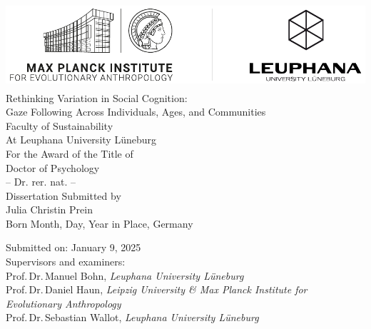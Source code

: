 \documentclass[
]{scrbook}
\author{}
\date{\vspace{-2.5em}}
\begin{document}
\frontmatter

\begin{titlepage}                   
    \begin{center}
        \includegraphics[height=3.2cm]{logo.pdf}\\[40mm]
        
        \huge {\linespread{1.5} Rethinking Variation in Social Cognition: \\ Gaze Following Across Individuals, Ages, and Communities}\\[30mm]
        
                
        \normalsize 
        Faculty of Sustainability \\ 
        At Leuphana University Lüneburg\\
      For the Award of the Title of\\ [10mm]
        
        Doctor of Psychology\\
        -- Dr. rer. nat. --\\[10mm]
        
        Dissertation Submitted by\\
        Julia Christin Prein\\[10mm]
        
        Born Month, Day, Year in Place, Germany
        
    \vspace*{\fill} 
    \end{center}
    
    \newpage
    \thispagestyle{empty}
    \begin{flushleft}
      \begin{normalsize}
      \vspace*{5mm}
      
            Submitted on: January 9, 2025\tabto*{45mm}\\[10mm]
            
            
            Supervisors and examiners: \\[5mm]
            \tabto*{5mm} Prof.\,Dr.\,Manuel Bohn, \textit{Leuphana University Lüneburg}\\
            \tabto*{5mm} Prof.\,Dr.\,Daniel Haun, \textit{Leipzig University \& Max Planck Institute for Evolutionary Anthropology}\\
                \tabto*{5mm} Prof.\,Dr.\,Sebastian Wallot, \textit{Leuphana University Lüneburg}\\[10mm]
                

\end{normalsize}
\end{flushleft}
\end{titlepage}
\end{document}
